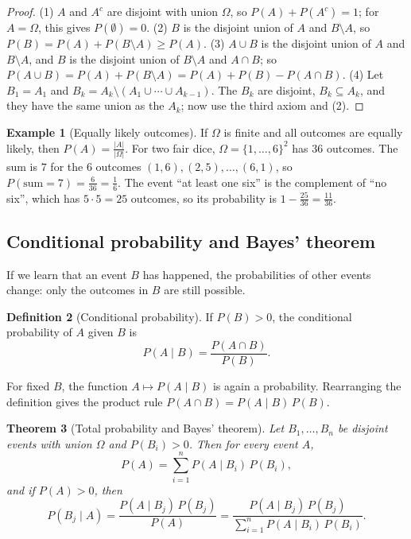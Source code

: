 \documentclass[11pt]{article}
\theoremstyle{definition}
\newtheorem{definition}{Definition}[section]
\newtheorem{example}[definition]{Example}
\theoremstyle{plain}
\newtheorem{theorem}[definition]{Theorem}
\theoremstyle{remark}
\begin{document}
\begin{proof}
    (1) $A$ and $A^c$ are disjoint with union $\Omega$, so $P(A) + P(A^c) = 1$; for $A = \Omega$, this gives $P(\emptyset) = 0$. (2) $B$ is the disjoint union of $A$ and $B \setminus A$, so $P(B) = P(A) + P(B \setminus A) \geq P(A)$. (3) $A \cup B$ is the disjoint union of $A$ and $B \setminus A$, and $B$ is the disjoint union of $B \setminus A$ and $A \cap B$; so $P(A \cup B) = P(A) + P(B \setminus A) = P(A) + P(B) - P(A \cap B)$. (4) Let $B_1 = A_1$ and $B_k = A_k \setminus (A_1 \cup \cdots \cup A_{k-1})$. The $B_k$ are disjoint, $B_k \subseteq A_k$, and they have the same union as the $A_k$; now use the third axiom and (2).
\end{proof}

\begin{example}[Equally likely outcomes]\label{ex:dice}
    If $\Omega$ is finite and all outcomes are equally likely, then $P(A) = \frac{|A|}{|\Omega|}$. For two fair dice, $\Omega = \{1, \ldots, 6\}^2$ has $36$ outcomes. The sum is $7$ for the $6$ outcomes $(1, 6), (2, 5), \ldots, (6, 1)$, so $P(\text{sum} = 7) = \frac{6}{36} = \frac{1}{6}$. The event ``at least one six'' is the complement of ``no six'', which has $5 \cdot 5 = 25$ outcomes, so its probability is $1 - \frac{25}{36} = \frac{11}{36}$.
\end{example}

\subsection{Conditional probability and Bayes' theorem}

If we learn that an event $B$ has happened, the probabilities of other events change: only the outcomes in $B$ are still possible.

\begin{definition}[Conditional probability]\label{def:conditional}
    If $P(B) > 0$, the conditional probability of $A$ given $B$ is
    \[P(A \mid B) = \frac{P(A \cap B)}{P(B)}.\]
\end{definition}

For fixed $B$, the function $A \mapsto P(A \mid B)$ is again a probability. Rearranging the definition gives the product rule $P(A \cap B) = P(A \mid B)\,P(B)$.

\begin{theorem}[Total probability and Bayes' theorem]\label{thm:bayes}
    Let $B_1, \ldots, B_n$ be disjoint events with union $\Omega$ and $P(B_i) > 0$. Then for every event $A$,
    \[P(A) = \sum_{i=1}^n P(A \mid B_i)\,P(B_i),\]
    and if $P(A) > 0$, then
    \[P(B_j \mid A) = \frac{P(A \mid B_j)\,P(B_j)}{P(A)} = \frac{P(A \mid B_j)\,P(B_j)}{\sum_{i=1}^n P(A \mid B_i)\,P(B_i)}.\]
\end{theorem}
\end{document}
